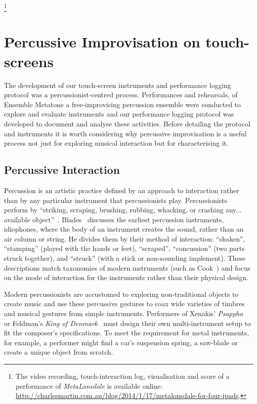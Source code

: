 \documentclass[graybox]{svmult}
\begin{document}
\footnote{\label{note1}The video recording, touch-interaction log,
  visualisation and score of a performance of \emph{MetaLonsdale} is
  available online:
  \url{http://charlesmartin.com.au/blog/2014/1/17/metalonsdale-for-four-ipads}.}

\section{Percussive Improvisation on touch-screens}


The development of our touch-screen instruments and performance
logging protocol was a percussionist-centred process. Performances and
rehearsals, of Ensemble Metatone a free-improvising percussion
ensemble were conducted to explore and evaluate instruments and our
performance logging protocol was developed to document and analyse
these activities. Before detailing the protocol and instruments it is
worth considering why percussive improvisation is a useful process not
just for exploring musical interaction but for characterising it.

\subsection{Percussive Interaction}

Percussion is an artistic practice defined by an approach to
interaction rather than by any particular instrument that
percussionists play. Percussionists perform by ``striking, scraping,
brushing, rubbing, whacking, or crashing any... available
object''~\cite{Schick:2006fk}. Blades~\cite{Blades:1992kx} discusses
the earliest percussion instruments, idiophones, where the body of an
instrument creates the sound, rather than an air column or string. He
divides them by their method of interaction: ``shaken'', ``stamping''
(played with the hands or feet), ``scraped'', ``concussion'' (two
parts struck together), and ``struck'' (with a stick or non-sounding
implement). These descriptions match taxonomies of modern instruments
(such as Cook~\cite{Cook:1997vn}) and focus on the mode of interaction
for the instruments rather than their physical design.

Modern percussionists are accustomed to exploring non-traditional
objects to create music and use these percussive gestures to coax wide
varieties of timbres and musical gestures from simple instruments.
Performers of Xenakis' \emph{Psappha}~\cite{Xenakis:1975uq} or
Feldman's \emph{King of Denmark}~\cite{Feldman:1965uq} must design
their own multi-instrument setup to fit the composer's specifications.
To meet the requirement for metal instruments, for example, a
performer might find a car's suspension spring, a saw-blade or create
a unique object from scratch.
\end{document}
